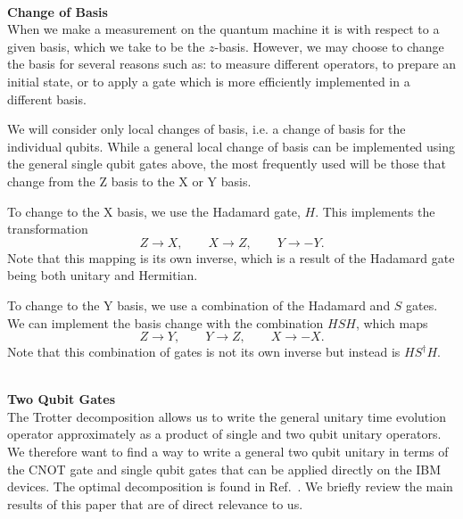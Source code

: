 \documentclass[twocolumn,showpacs,preprintnumbers,nofootinbib,amsmath,aps,pra,longbibliography,amssymb,superscriptaddress]{revtex4-1}
\begin{document}
\hfill\\\textbf{Change of Basis}\\
When we make a measurement on the quantum machine it is with respect to a given basis, which we take to be the $z$-basis. However, we may choose to change the basis for several reasons such as: to measure different operators, to prepare an initial state, or to apply a gate which is more efficiently implemented in a different basis.

We will consider only local changes of basis, i.e. a change of basis for the individual qubits. While a general local change of basis can be implemented using the general single qubit gates above, the most frequently used will be those that change from the Z basis to the X or Y basis.

To change to the X basis, we use the Hadamard gate, $H$. This implements the transformation
\begin{equation}
Z \rightarrow X, \qquad X \rightarrow Z, \qquad Y \rightarrow -Y.
\end{equation}
Note that this mapping is its own inverse, which is a result of the Hadamard gate being both unitary and Hermitian.

To change to the Y basis, we use a combination of the Hadamard and $S$ gates. We can implement the basis change with the combination $HSH$, which maps
\begin{equation}
Z \rightarrow  Y, \qquad Y \rightarrow  Z, \qquad X \rightarrow -X.
\end{equation}
Note that this combination of gates is not its own inverse but instead is $HS^\dag H$.






\hfill\\\textbf{Two Qubit Gates}\\
The Trotter decomposition allows us to write the general unitary time evolution operator approximately as a product of single and two qubit unitary operators. We therefore want to find a way to write a general two qubit unitary in terms of the CNOT gate and single qubit gates that can be applied directly on the IBM devices. The optimal decomposition is found in Ref.~\cite{Vatan2004a}. We briefly review the main results of this paper that are of direct relevance to us. 
\end{document}
